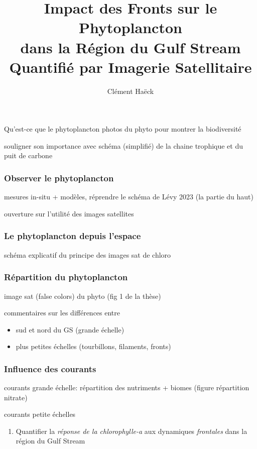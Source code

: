 \documentclass[11pt, french]{beamer}
\title{%
  Impact des Fronts sur le Phytoplancton\\
  dans la Région du Gulf Stream\\
  Quantifié par Imagerie Satellitaire
}
\author{Clément Haëck}
\institute{%
  Laboratoire d'Océanographie et du Climat\\Expérimentations et Analyses Numériques
}
\begin{document}
{
  \begin{frame}
    \titlepage%
  \end{frame}
}

\begin{frame}{Qu'est-ce que le phytoplancton}
  photos du phyto pour montrer la biodiversité

  souligner son importance avec schéma (simplifié) de la chaine trophique et du puit de carbone
\end{frame}

\begin{frame}
  \frametitle{Observer le phytoplancton}
  mesures in-situ + modèles, réprendre le schéma de Lévy 2023 (la partie du haut)

  ouverture sur l'utilité des images satellites
\end{frame}

\begin{frame}
  \frametitle{Le phytoplancton depuis l'espace}
  schéma explicatif du principe des images sat de chloro
\end{frame}

\begin{frame}
  \frametitle{Répartition du phytoplancton}
  image sat (false colors) du phyto (fig 1 de la thèse)

  commentaires sur les différences entre
  \begin{itemize}
    \item sud et nord du GS (grande échelle)
    \item plus petites échelles (tourbillons, filaments, \alert{fronts})
  \end{itemize}
\end{frame}

\begin{frame}
  \frametitle{Influence des courants}
  courants grande échelle: répartition des nutriments + biomes (figure répartition nitrate)

  courants petite échelles
\end{frame}

\begin{frame}
  \vspace{2em}

  \begin{enumerate}
    \setlength{\itemsep}{1em}
    \item Quantifier la \emph{réponse de la chlorophylle-a} aux dynamiques \emph{frontales} dans la région du Gulf Stream
  \end{enumerate}
\end{frame}
\end{document}
